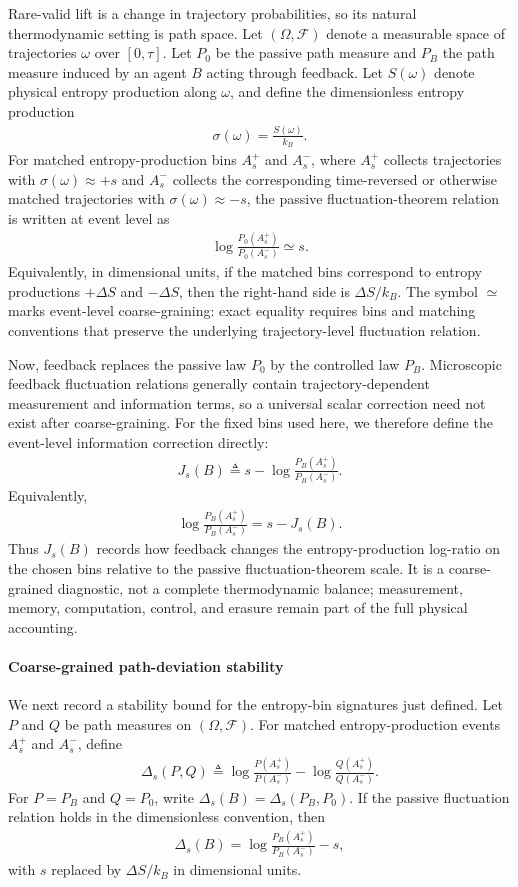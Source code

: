 \documentclass[
  aps,
  prresearch,
  reprint,
  amsmath,
  amssymb,
  superscriptaddress,
  nofootinbib,
  longbibliography
]{revtex4-2}
\def\EQSP{3pt}
\newcommand{\cgather}[2][\EQSP]{\begingroup\setlength\abovedisplayskip{#1}\setlength\belowdisplayskip{#1}\begin{gather} #2 \end{gather}\endgroup\noindent}
\begin{document}
Rare-valid lift is a change in trajectory probabilities, so its natural thermodynamic setting is path space. Let \((\Omega,\mathcal F)\) denote a measurable space of trajectories \(\omega\) over \([0,\tau]\). Let \(P_0\) be the passive path measure and \(P_B\) the path measure induced by an agent \(B\) acting through feedback. Let \(S(\omega)\) denote physical entropy production along \(\omega\), and define the dimensionless entropy production
\cgather{
    \sigma(\omega)=\frac{S(\omega)}{k_B}.
}
For matched entropy-production bins \(A_s^+\) and \(A_s^-\), where \(A_s^+\) collects trajectories with \(\sigma(\omega)\approx+s\) and \(A_s^-\) collects the corresponding time-reversed or otherwise matched trajectories with \(\sigma(\omega)\approx-s\), the passive fluctuation-theorem relation is written at event level as
\cgather{
    \log\frac{P_0(A_s^+)}{P_0(A_s^-)}\simeq s.
    \label{eq:passive_event_relation}
}%
Equivalently, in dimensional units, if the matched bins correspond to entropy productions \(+\Delta S\) and \(-\Delta S\), then the right-hand side is \(\Delta S/k_B\). The symbol \(\simeq\) marks event-level coarse-graining: exact equality requires bins and matching conventions that preserve the underlying trajectory-level fluctuation relation.

Now, feedback replaces the passive law \(P_0\) by the controlled law \(P_B\). Microscopic feedback fluctuation relations generally contain trajectory-dependent measurement and information terms, so a universal scalar correction need not exist after coarse-graining. For the fixed bins used here, we therefore define the event-level information correction directly:
\cgather{
    J_s(B)
    \triangleq 
    s-
    \log\frac{P_B(A_s^+)}{P_B(A_s^-)}.
    \label{eq:Js_def}
}
Equivalently,
\cgather{
    \log\frac{P_B(A_s^+)}{P_B(A_s^-)}
    =
    s-J_s(B).
    \label{eq:controlled_event_relation}
}
Thus \(J_s(B)\) records how feedback changes the entropy-production log-ratio on the chosen bins relative to the passive fluctuation-theorem scale. It is a coarse-grained diagnostic, not a complete thermodynamic balance; measurement, memory, computation, control, and erasure remain part of the full physical accounting.

\paragraph{Coarse-grained path-deviation stability}
\label{sec:theorem1}

We next record a stability bound for the entropy-bin signatures just defined. Let \(P\) and \(Q\) be path measures on \((\Omega,\mathcal F)\). For matched entropy-production events \(A_s^+\) and \(A_s^-\), define
\cgather{
    \Delta_s(P,Q)
    \triangleq
    \log \frac{P(A_s^+)}{P(A_s^-)}
    -
    \log \frac{Q(A_s^+)}{Q(A_s^-)}.
    \label{eq:delta_pq}
}
For \(P=P_B\) and \(Q=P_0\), write \(\Delta_s(B)=\Delta_s(P_B,P_0)\). If the passive fluctuation relation holds in the dimensionless convention, then
\cgather{
    \Delta_s(B)
    =
    \log\frac{P_B(A_s^+)}{P_B(A_s^-)}
    -
    s,
}
with \(s\) replaced by \(\Delta S/k_B\) in dimensional units.
\end{document}

